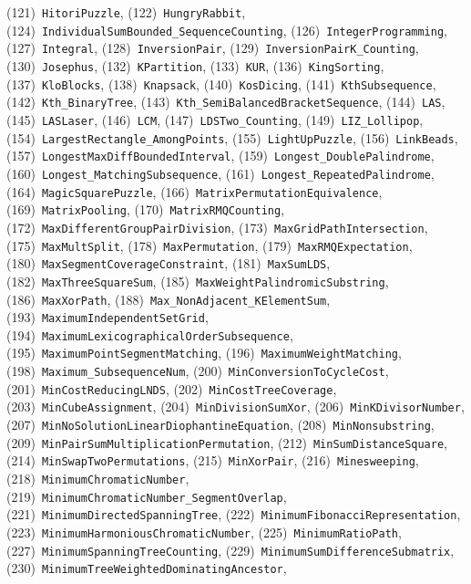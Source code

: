 \documentclass{article}
\theoremstyle{plain}
\theoremstyle{definition}
\theoremstyle{remark}
\begin{document}
\begin{flushleft}
(121)~\texttt{HitoriPuzzle},
(122)~\texttt{HungryRabbit},
(124)~\texttt{IndividualSumBounded\_SequenceCounting},
(126)~\texttt{IntegerProgramming},
(127)~\texttt{Integral},
(128)~\texttt{InversionPair},
(129)~\texttt{InversionPairK\_Counting},
(130)~\texttt{Josephus},
(132)~\texttt{KPartition},
(133)~\texttt{KUR},
(136)~\texttt{KingSorting},
(137)~\texttt{KloBlocks},
(138)~\texttt{Knapsack},
(140)~\texttt{KosDicing},
(141)~\texttt{KthSubsequence},
(142)~\texttt{Kth\_BinaryTree},
(143)~\texttt{Kth\_SemiBalancedBracketSequence},
(144)~\texttt{LAS},
(145)~\texttt{LASLaser},
(146)~\texttt{LCM},
(147)~\texttt{LDSTwo\_Counting},
(149)~\texttt{LIZ\_Lollipop},
(154)~\texttt{LargestRectangle\_AmongPoints},
(155)~\texttt{LightUpPuzzle},
(156)~\texttt{LinkBeads},
(157)~\texttt{LongestMaxDiffBoundedInterval},
(159)~\texttt{Longest\_DoublePalindrome},
(160)~\texttt{Longest\_MatchingSubsequence},
(161)~\texttt{Longest\_RepeatedPalindrome},
(164)~\texttt{MagicSquarePuzzle},
(166)~\texttt{MatrixPermutationEquivalence},
(169)~\texttt{MatrixPooling},
(170)~\texttt{MatrixRMQCounting},
(172)~\texttt{MaxDifferentGroupPairDivision},
(173)~\texttt{MaxGridPathIntersection},
(175)~\texttt{MaxMultSplit},
(178)~\texttt{MaxPermutation},
(179)~\texttt{MaxRMQExpectation},
(180)~\texttt{MaxSegmentCoverageConstraint},
(181)~\texttt{MaxSumLDS},
(182)~\texttt{MaxThreeSquareSum},
(185)~\texttt{MaxWeightPalindromicSubstring},
(186)~\texttt{MaxXorPath},
(188)~\texttt{Max\_NonAdjacent\_KElementSum},
(193)~\texttt{MaximumIndependentSetGrid},
(194)~\texttt{MaximumLexicographicalOrderSubsequence},
(195)~\texttt{MaximumPointSegmentMatching},
(196)~\texttt{MaximumWeightMatching},
(198)~\texttt{Maximum\_SubsequenceNum},
(200)~\texttt{MinConversionToCycleCost},
(201)~\texttt{MinCostReducingLNDS},
(202)~\texttt{MinCostTreeCoverage},
(203)~\texttt{MinCubeAssignment},
(204)~\texttt{MinDivisionSumXor},
(206)~\texttt{MinKDivisorNumber},
(207)~\texttt{MinNoSolutionLinearDiophantineEquation},
(208)~\texttt{MinNonsubstring},
(209)~\texttt{MinPairSumMultiplicationPermutation},
(212)~\texttt{MinSumDistanceSquare},
(214)~\texttt{MinSwapTwoPermutations},
(215)~\texttt{MinXorPair},
(216)~\texttt{Minesweeping},
(218)~\texttt{MinimumChromaticNumber},
(219)~\texttt{MinimumChromaticNumber\_SegmentOverlap},
(221)~\texttt{MinimumDirectedSpanningTree},
(222)~\texttt{MinimumFibonacciRepresentation},
(223)~\texttt{MinimumHarmoniousChromaticNumber},
(225)~\texttt{MinimumRatioPath},
(227)~\texttt{MinimumSpanningTreeCounting},
(229)~\texttt{MinimumSumDifferenceSubmatrix},
(230)~\texttt{MinimumTreeWeightedDominatingAncestor},

\end{flushleft}
\end{document}
